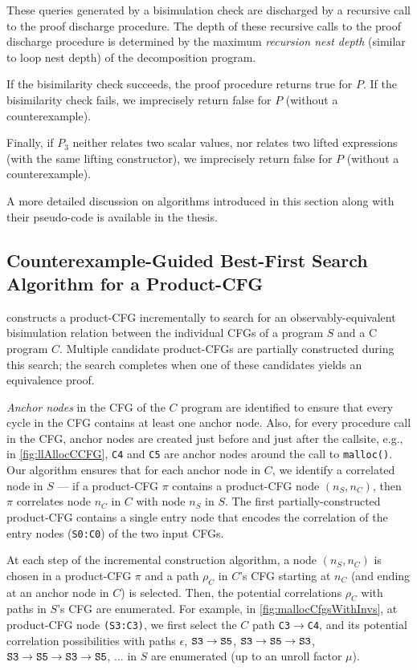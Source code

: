 These queries
generated by a bisimulation check are discharged
by a recursive call to the proof discharge procedure.
The depth of these recursive calls to the
proof discharge procedure is determined by
the maximum {\em recursion nest depth} (similar
to loop nest depth) of the decomposition
program.

If the bisimilarity check succeeds, the proof procedure returns
true for $P$.
If the bisimilarity check fails,
we imprecisely return false for $P$ (without a counterexample).

Finally, if $P_3$ neither
relates two scalar values, nor relates two
lifted expressions (with the same lifting constructor),
we imprecisely return false for $P$ (without a counterexample).

A more detailed discussion on algorithms introduced in this section
along with their pseudo-code is available in the thesis.

\subsection{Counterexample-Guided Best-First Search Algorithm for a Product-CFG}
\label{sec:searchAlgoInformal}

\toolName{} constructs a product-CFG incrementally to search for
an observably-equivalent bisimulation relation between
the individual CFGs of a \SpecL{} program $S$ and a C program $C$.
Multiple candidate product-CFGs are partially constructed
during this search; the search completes when one of these
candidates yields an equivalence proof.

{\em Anchor nodes} in the CFG of the $C$ program
are identified to ensure that every cycle in the CFG
contains at least one anchor node. Also, for
every procedure call in the CFG, anchor nodes
are created just before and just after the callsite, e.g.,
in \cref{fig:llAllocCCFG}, {\tt C4} and {\tt C5} are anchor
nodes around the call to {\tt malloc()}.
Our algorithm
ensures that for each anchor node in $C$, we
identify a correlated node in $S$ --- if
a product-CFG $\pi$
contains a product-CFG node $(n_S,n_C)$, then $\pi$
correlates node $n_C$
in $C$ with node $n_S$ in $S$.
The
first partially-constructed product-CFG
contains a single entry node
that encodes the correlation of the entry nodes ({\tt S0:C0})
of the two input CFGs.

At each step of the incremental construction algorithm,
a node $(n_S,n_C)$ is chosen in a product-CFG $\pi$
and a path $\rho_C$ in $C$'s CFG starting at $n_C$ (and
ending at an anchor node in $C$) is selected.
Then, the potential correlations $\rho_C$
with paths
in $S$'s CFG are enumerated.
For
example, in \cref{fig:mallocCfgsWithInvs}, at product-CFG
node {\tt (S3:C3)}, we first select the $C$ path {\tt C3$\rightarrow$C4},
and its potential correlation possibilities
with paths $\epsilon$, ${\tt S3\rightarrow{}S5}$, ${\tt S3\rightarrow{}S5\rightarrow{}S3}$, ${\tt S3\rightarrow{}S5\rightarrow{}S3\rightarrow{}S5}$, ... in $S$ are enumerated (up to an unroll factor $\mu$).

